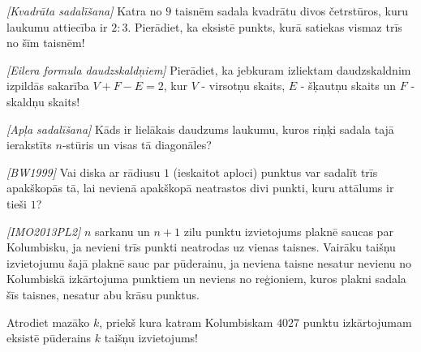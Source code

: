 

%


\noindent 

\begin{problem}
\textit{[Kvadrāta sadalīšana]}
Katra no $9$ taisnēm sadala kvadrātu divos četrstūros, kuru laukumu attiecība ir $2:3$. Pierādiet, ka eksistē punkts, kurā satiekas vismaz trīs no šīm taisnēm!
\end{problem}
%

\begin{problem}
\textit{[Eilera formula daudzskaldņiem]}
Pierādiet, ka jebkuram izliektam daudzskaldnim izpildās sakarība $V+F-E=2$, kur $V$ - virsotņu skaits, $E$ - šķautņu skaits un $F$ - skaldņu skaits!
\end{problem}

\begin{problem}
\textit{[Apļa sadalīšana]}
Kāds ir lielākais daudzums laukumu, kuros riņķi sadala tajā ierakstīts $n$-stūris un visas tā diagonāles?
\end{problem}


\begin{problem}
\textit{[BW1999]}
Vai diska ar rādiusu $1$ (ieskaitot aploci) punktus var sadalīt trīs apakškopās tā, lai nevienā apakškopā neatrastos divi punkti, kuru attālums ir tieši $1$?
\end{problem}

\begin{problem}
\textit{[IMO2013PL2]}
$n$ sarkanu un $n+1$ zilu punktu izvietojums plaknē saucas par Kolumbisku, ja nevieni trīs punkti neatrodas uz vienas taisnes. Vairāku taišņu izvietojumu šajā plaknē sauc par pūderainu, ja neviena taisne nesatur nevienu no Kolumbiskā izkārtojuma punktiem un neviens no reģioniem, kuros plakni sadala šīs taisnes, nesatur abu krāsu punktus. 

Atrodiet mazāko $k$, priekš kura katram Kolumbiskam $4027$ punktu izkārtojumam eksistē pūderains $k$ taišņu izvietojums!
\end{problem}

